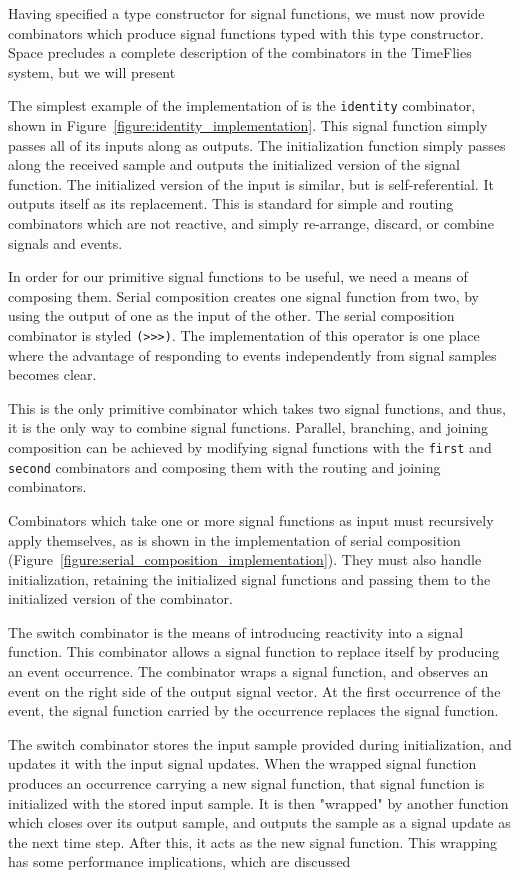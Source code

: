 Having specified a type constructor for signal functions, we must now provide
combinators which produce signal functions typed with this type constructor.
Space precludes a complete description of the combinators in the TimeFlies
system, but we will present 

The simplest example of the implementation of is the {\tt identity} combinator,
shown in Figure~\ref{figure:identity_implementation}. This signal function
simply passes all of its inputs along as outputs. The initialization function
simply passes along the received sample and outputs the initialized version of
the signal function. The initialized version of the input is similar, but is
self-referential. It outputs itself as its replacement. This is standard for
simple and routing combinators which are not reactive, and simply re-arrange,
discard, or combine signals and events.

In order for our primitive signal functions to be useful, we need a means of
composing them. Serial composition creates one signal function from two, by
using the output of one as the input of the other. The serial composition
combinator is styled {\tt (>>>)}. The implementation of this operator is one
place where the advantage of responding to events independently from signal
samples becomes clear. 

This is the only primitive combinator which takes two signal functions, and
thus, it is the only way to combine signal functions. Parallel, branching, and
joining composition can be achieved by modifying signal functions with the
{\tt first} and {\tt second} combinators and composing them with the
routing and joining combinators.

Combinators which take one or more signal functions as input must recursively
apply themselves, as is shown in the implementation of serial composition
(Figure~\ref{figure:serial_composition_implementation}). They must also
handle initialization, retaining the initialized signal functions and passing
them to the initialized version of the combinator.

The switch combinator is the means of introducing reactivity into a signal
function. This combinator allows a signal function to replace itself by
producing an event occurrence. The combinator wraps a signal function, and 
observes an event on the right side of the output signal vector. At the first
occurrence of the event, the signal function carried by the occurrence replaces
the signal function. 

The switch combinator stores the input sample provided during initialization,
and updates it with the input signal updates. When the wrapped signal function
produces an occurrence carrying a new signal function, that signal function is
initialized with the stored input sample. It is then "wrapped" by another
function which closes over its output sample, and outputs the sample as a signal
update as the next time step. After this, it acts as the new signal function.
This wrapping has some performance implications, which are discussed 

